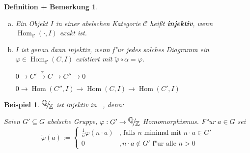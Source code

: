 \documentclass[paper = A4, fontsize=12pt, numbers=noendperiod, chapterprefix=true]{scrbook}
\theoremstyle{break}
\newtheorem{DefBem}[Def]{Definition + Bemerkung}
\theoremstyle{nonumberbreak}
\newtheorem{bsp}{Beispiel}
\theoremstyle{nonumberplain}
\newcommand{\emp}[1]{\textbf{\emph{#1}}}
\newcommand{\defterm}[1]{{\index{#1}}\emp{#1}}
\DeclareMathOperator{\Hom}{Hom}
\DeclareMathOperator{\Ab}{\underline{Ab}}
\newcommand{\Q}{\mathbb{Q}}
\newcommand{\Z}{\mathbb{Z}}
\newcommand{\calC}{\mathcal{C}}
\newcommand{\FakRaum}[2]{
	\raisebox{0.7ex}{\ensuremath{#1}}
	\ensuremath{\mkern-3mu}\big/\ensuremath{\mkern-3mu}
	\raisebox{-0.6ex}{\ensuremath{#2}}}
\begin{document}
\begin{DefBem}\begin{enumerate}[a)]
\item
	Ein Objekt $I$ in einer abelschen Kategorie $\calC$ hei\ss t \defterm{injektiv}, wenn $\Hom_\calC(\cdot, I)$ exakt ist.
\item
	$I$ ist genau dann injektiv, wenn f"ur jedes solches Diagramm ein $\varphi \in \Hom_\calC(C, I)$ existiert mit $\tilde \varphi \circ \alpha = \varphi$.
	\begin{center}\end{center}
	
	$0 \to C' \xrightarrow{\alpha} C \to C'' \to 0$
	
	$0 \to \Hom(C'', I) \to \Hom(C, I) \to \Hom(C', I)$
\end{enumerate}\end{DefBem}

\begin{bsp}
$\FakRaum{\Q}{\Z}$ ist injektiv in $\Ab$, \emph{denn}:

Seien $G' \subseteq G$ abelsche Gruppe, $\varphi: G' \to \FakRaum{\Q}{\Z}$ Homomorphismus. F"ur $a \in G$ sei
	\[ \tilde \varphi(a) := \begin{cases} \frac{1}{n} \varphi(n \cdot a) & \text{, falls } n \text{ minimal mit } n \cdot a \in G' \\
		0 & , n \cdot a \notin G' \text{ f"ur alle } n > 0 \end{cases}\]
\end{bsp}
\end{document}
